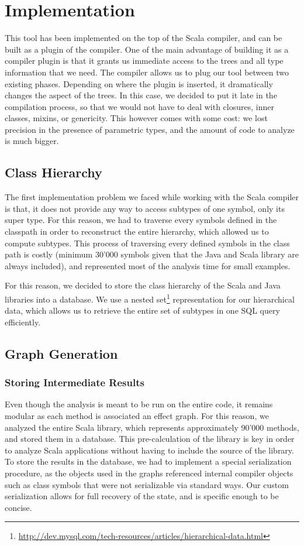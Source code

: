 \chapter{Implementation}
\label{chap:implementation}
This tool has been implemented on the top of the Scala compiler, and can be
built as a plugin of the compiler. One of the main advantage of building it as
a compiler plugin is that it grants us immediate access to the trees and all
type information that we need. The compiler allows us to plug our tool between
two existing phases. Depending on where the plugin is inserted, it dramatically
changes the aspect of the trees. In this case, we decided to put it late in the
compilation process, so that we would not have to deal with closures, inner
classes, mixins, or genericity. This however comes with some cost: we lost
precision in the presence of parametric types, and the amount of code to
analyze is much bigger.

\section{Class Hierarchy}
The first implementation problem we faced while working with the Scala compiler
is that, it does not provide any way to access subtypes of one symbol, only its
super type. For this reason, we had to traverse every symbols defined in the
classpath in order to reconstruct the entire hierarchy, which allowed us to
compute subtypes. This process of traversing every defined symbols in the class
path is costly (minimum 30'000 symbols given that the Java and Scala library are always
included), and represented most of the analysis time for small examples.

For this reason, we decided to store the class hierarchy of the Scala and Java
libraries into a database. We use a nested
set\footnote{\url{http://dev.mysql.com/tech-resources/articles/hierarchical-data.html}}
representation for our hierarchical data, which allows us to retrieve the entire
set of subtypes in one SQL query efficiently.

\section{Graph Generation}
\subsection{Storing Intermediate Results}
Even though the analysis is meant to be run on the entire code, it remains
modular as each method is associated an effect graph. For this reason, we
analyzed the entire Scala library, which represents approximately 90'000
methods, and stored them in a database. This pre-calculation of the library is
key in order to analyze Scala applications without having to include the
source of the library. To store the results in the database, we had to
implement a special serialization procedure, as the objects used in the graphs
referenced internal compiler objects such as class symbols that were not
serializable via standard ways. Our custom serialization allows for full
recovery of the state, and is specific enough to be concise.


